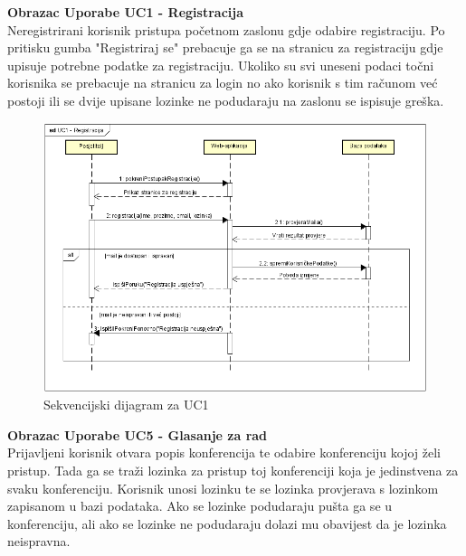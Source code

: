 		\textbf{Obrazac Uporabe UC1 - Registracija}\\Neregistrirani korisnik pristupa početnom zaslonu gdje odabire registraciju. Po pritisku gumba "Registriraj se" prebacuje ga se na stranicu za registraciju gdje upisuje potrebne podatke za registraciju. Ukoliko su svi uneseni podaci točni korisnika se prebacuje na stranicu za login no ako korisnik s tim računom već postoji ili se dvije upisane lozinke ne podudaraju na zaslonu se ispisuje greška.
		
		
		\begin{figure}[H]
			\includegraphics[scale=0.7]{slike/UC1.PNG} 
			\centering
			\caption{Sekvencijski dijagram za UC1}
			\label{fig:UC1}
		\end{figure}
		\newpage
		\textbf{Obrazac Uporabe UC5 - Glasanje za rad}\\Prijavljeni korisnik otvara popis konferencija te odabire konferenciju kojoj želi pristup. Tada ga se traži lozinka za pristup toj konferenciji koja je jedinstvena za svaku konferenciju. Korisnik unosi lozinku te se lozinka provjerava s lozinkom zapisanom u bazi podataka. Ako se lozinke podudaraju pušta ga se u konferenciju, ali ako se lozinke ne podudaraju dolazi mu obavijest da je lozinka neispravna.
		

